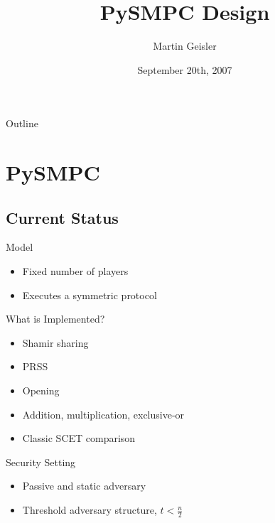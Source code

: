 \documentclass[t,noamsthm]{beamer}
\title{PySMPC Design}
\author{Martin Geisler}
\institute[BRICS]{
  BRICS\\
  Department of Computer Science\\
  University of Aarhus
}
\date{September 20th, 2007}
\begin{document}
\begin{frame}
  \titlepage
\end{frame}

\begin{frame}{Outline}
  \tableofcontents
\end{frame}



\section{PySMPC}

\subsection{Current Status}

\begin{frame}{Model}

  \begin{itemize}
  \item Fixed number of players
  \item Executes a symmetric protocol
  \end{itemize}

\end{frame}

\begin{frame}{What is Implemented?}

  \begin{itemize}
  \item Shamir sharing
  \item PRSS
  \item Opening
  \item Addition, multiplication, exclusive-or
  \item Classic SCET comparison
  \end{itemize}

\end{frame}

\begin{frame}{Security Setting}

  \begin{itemize}
  \item Passive and static adversary
  \item Threshold adversary structure, $t < \frac n 2$
  \end{itemize}

\end{frame}
\end{document}
